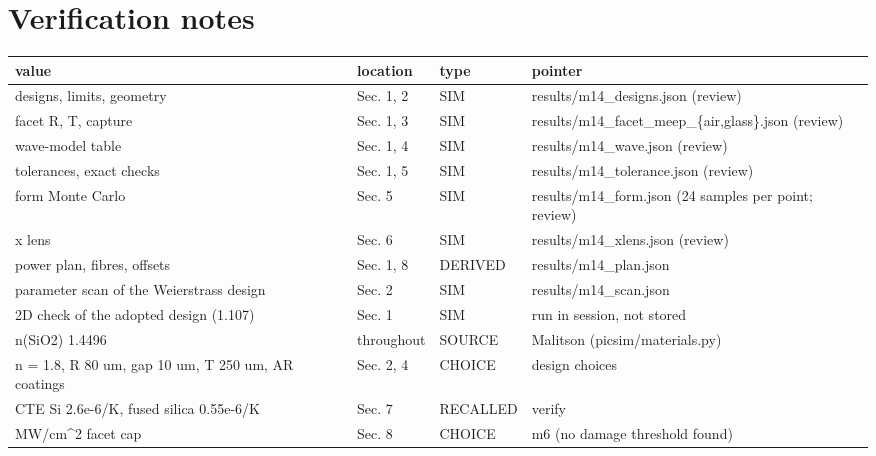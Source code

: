 \hypertarget{verification-notes}{%
\section{Verification notes}\label{collimator-verification-notes}}

{\footnotesize
\begin{longtable}[]{@{}>{\raggedright\arraybackslash}p{0.230\dimexpr(\linewidth-8\tabcolsep)\relax}>{\raggedright\arraybackslash}p{0.129\dimexpr(\linewidth-8\tabcolsep)\relax}>{\raggedright\arraybackslash}p{0.101\dimexpr(\linewidth-8\tabcolsep)\relax}>{\raggedright\arraybackslash}p{0.539\dimexpr(\linewidth-8\tabcolsep)\relax}@{}}
\toprule\noalign{}
value & location & type & pointer \\
\midrule\noalign{}
\endhead
\bottomrule\noalign{}
\endlastfoot
designs, limits, geometry & Sec. 1, 2 & SIM & results/m14\_designs.json
(review) \\
facet R, T, capture & Sec. 1, 3 & SIM &
results/m14\_facet\_meep\_\{air,glass\}.json (review) \\
wave-model table & Sec. 1, 4 & SIM & results/m14\_wave.json (review) \\
tolerances, exact checks & Sec. 1, 5 & SIM & results/m14\_tolerance.json
(review) \\
form Monte Carlo & Sec. 5 & SIM & results/m14\_form.json (24 samples per
point; review) \\
x lens & Sec. 6 & SIM & results/m14\_xlens.json (review) \\
power plan, fibres, offsets & Sec. 1, 8 & DERIVED &
results/m14\_plan.json \\
parameter scan of the Weierstrass design & Sec. 2 & SIM &
results/m14\_scan.json \\
2D check of the adopted design (1.107) & Sec. 1 & SIM & run in session,
not stored \\
n(SiO2) 1.4496 & throughout & SOURCE & Malitson (picsim/materials.py) \\
n = 1.8, R 80 um, gap 10 um, T 250 um, AR coatings & Sec. 2, 4 & CHOICE
& design choices \\
CTE Si 2.6e-6/K, fused silica 0.55e-6/K & Sec. 7 & RECALLED & verify \\
20 MW/cm\^{}2 facet cap & Sec. 8 & CHOICE & m6 (no damage threshold
found) \\
\end{longtable}
}

